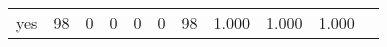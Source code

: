 \begin{longtable}{lp{1.10cm}p{1.10cm}p{1.10cm}p{1.10cm}p{1.10cm}p{1.10cm}p{1.10cm}p{1.10cm}p{1.10cm}p{1.10cm}}
yes       &                     98 &                                  0 &                                 0 &                                0 &                                 0 &                              98 &                          1.000 &                                 1.000 &                               1.000 \\
\end{longtable}
